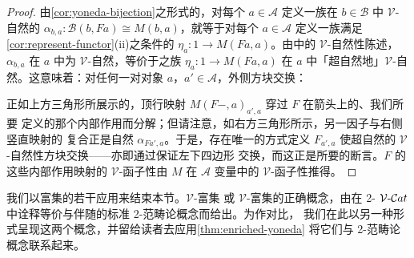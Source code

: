 \begin{proof}
由\cref{cor:yoneda-bijection}之形式的\trYonedaLemma，对每个 $a\in\mathcal{A}$
定义一族在 $b\in\mathcal{B}$ 中 $\mathcal{V}$-自然的\trIsomorphism{}
$\alpha_{b,a}\colon\mathcal{B}(b,Fa)\cong M(b,a)$，就等于对每个
$a\in\mathcal{A}$ 定义一族满足\cref{cor:represent-functor}(ii)之条件的%
\trElement{} $\eta_{a}\colon 1\to M(Fa,a)$。由\trYonedaLemma{}中的
$\mathcal{V}$-自然性陈述，\trIsomorphism{} $\alpha_{b,a}$ 在 $a$ 中为
$\mathcal{V}$-自然，等价于\trElement{}之族 $\eta_{a}\colon 1\to M(Fa,a)$ 在 $a$
中「超自然地」$\mathcal{V}$-自然。这意味着：对任何一对对象
$a$，$a'\in\mathcal{A}$，外侧方块交换：
\begin{center}
\end{center}
正如上方三角形所展示的，顶行映射 $M(F-,a)_{a',a}$ 穿过 $F$ 在箭头上的、我们所要
定义的那个内部作用而分解；但请注意，如右方三角形所示，另一因子与右侧竖直映射的
复合正是自然\trIsomorphism{} $\alpha_{Fa',a}$。于是，存在唯一的方式定义
$F_{a',a}$ 使超自然的 $\mathcal{V}$-自然性方块交换——亦即通过保证左下四边形
交换，而这正是所要的断言。$F$ 的这些内部作用映射的 $\mathcal{V}$-函子性由 $M$
在 $\mathcal{A}$ 变量中的 $\mathcal{V}$-函子性推得。
\end{proof}

我们以富集\trYonedaLemma{}的若干应用来结束本节。$\mathcal{V}$-富集\trEquivalence
或 $\mathcal{V}$-富集\trAdjunction{}的正确概念，由在 2-\trCategory{}
$\mathcal{V}\text{-}\mathcal{C}at$ 中诠释等价与伴随的标准 2-范畴论概念而给出。为作对比，
我们在此以另一种形式呈现这两个概念，并留给读者去应用\cref{thm:enriched-yoneda}
将它们与 2-范畴论概念联系起来。


